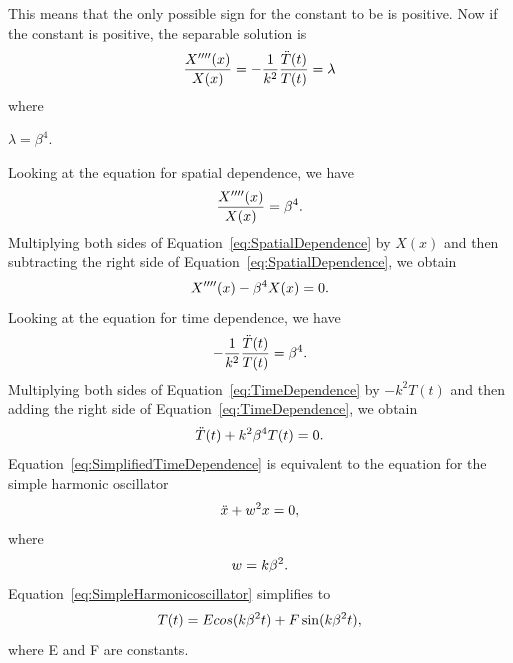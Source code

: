 \documentclass[12pt]{article}
\begin{document}
This means that the only possible sign for the constant to be is positive. Now if the constant is positive, the separable solution is
\begin{equation}\label{eq:SeparableSolutionPositive}
    \centering
    \frac{X''''(x)}{X(x)} = -\frac{1}{k^2}\frac{\ddot{T}(t)}{T(t)} = \lambda
\end{equation}
where

\centerline{$\lambda=\beta^4$.}

Looking at the equation for spatial dependence, we have
\begin{equation}\label{eq:SpatialDependence}
    \centering
    \frac{X''''(x)}{X(x)} = \beta^4.
\end{equation}
Multiplying both sides of Equation~\eqref{eq:SpatialDependence} by $X(x)$ and then subtracting the right side of Equation~\eqref{eq:SpatialDependence}, we obtain
\begin{equation}\label{eq:SimplifiedSpatialDependence}
    \centering
    X''''(x)-\beta^4X(x)=0.
\end{equation}
Looking at the equation for time dependence, we have
\begin{equation}\label{eq:TimeDependence}
    \centering
    -\frac{1}{k^2}\frac{\ddot{T}(t)}{T(t)} = \beta^4.
\end{equation}
Multiplying both sides of Equation~\eqref{eq:TimeDependence} by $-k^2T(t)$ and then adding the right side of Equation~\eqref{eq:TimeDependence}, we obtain
\begin{equation}\label{eq:SimplifiedTimeDependence}
    \centering
    \ddot{T}(t)+k^2\beta^4T(t) = 0.
\end{equation}
Equation~\eqref{eq:SimplifiedTimeDependence} is equivalent to the equation for the simple harmonic oscillator
\begin{equation}\label{eq:SimpleHarmonicoscillator}
    \centering
    \ddot{x}+w^2x = 0,
\end{equation}
where
\begin{equation}\label{eq:OmegaRelation}
    \centering
    w=k\beta^2.
\end{equation}
Equation~\eqref{eq:SimpleHarmonicoscillator} simplifies to  
\begin{equation}\label{eq:GeneralSolution}
    \centering
    T(t)=Ecos(k\beta^2t)+F\sin(k\beta^2t),
\end{equation}
where E and F are constants.
\end{document}
